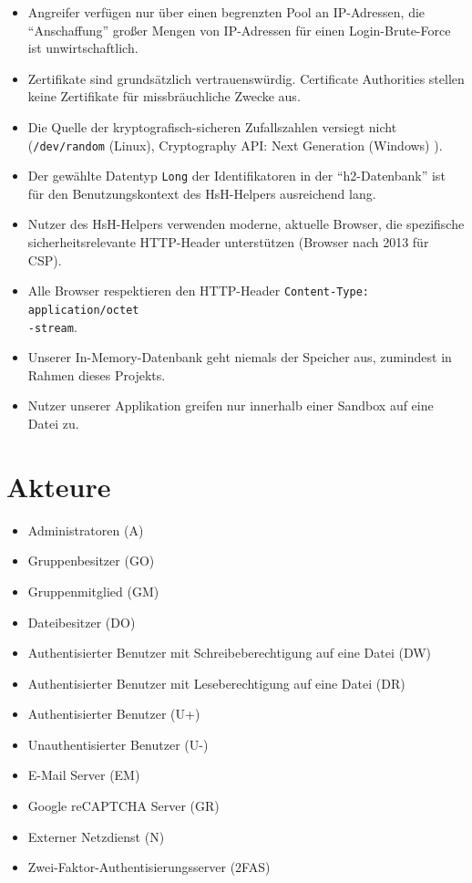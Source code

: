 \documentclass[fontsize=12pt,DIV=14,BCOR=10mm,a4paper,parskip=half-,headsepline,headinclude,english,ngerman,bibliography=totocnumbered]{scrreprt}
\begin{document}
\begin{itemize}
  \item Angreifer verfügen nur über einen begrenzten Pool an IP-Adressen, die \enquote{Anschaffung} großer Mengen von IP-Adressen für einen Login-Brute-Force ist unwirtschaftlich.
  \item Zertifikate sind grundsätzlich vertrauenswürdig. Certificate Authorities stellen keine Zertifikate für missbräuchliche Zwecke aus.
  \item Die Quelle der kryptografisch-sicheren Zufallszahlen versiegt nicht (\texttt{/dev/random} (Linux), Cryptography API: Next Generation (Windows) \autocite{Windows.SecureRandom}).
  \item Der gewählte Datentyp \texttt{Long} der Identifikatoren in der \enquote{h2-Datenbank} ist für den Benutzungskontext des HsH-Helpers ausreichend lang.
  \item Nutzer des HsH-Helpers verwenden moderne, aktuelle Browser, die spezifische sicherheitsrelevante HTTP-Header unterstützen (Browser nach 2013 für CSP).
  \item Alle Browser respektieren den HTTP-Header \texttt{Content-Type: application/octet\\-stream}.
  \item Unserer In-Memory-Datenbank geht niemals der Speicher aus, zumindest in Rahmen dieses Projekts.
  \item Nutzer unserer Applikation greifen nur innerhalb einer Sandbox auf eine Datei zu.
\end{itemize}

\renewcommand*{\chapterheadstartvskip}{\vspace*{\topskip}}

\chapter{Akteure}

\begin{itemize}
  \item Administratoren (A)
  \item Gruppenbesitzer (GO)
  \item Gruppenmitglied (GM)
  \item Dateibesitzer (DO)
  \item Authentisierter Benutzer mit Schreibeberechtigung auf eine Datei (DW)
  \item Authentisierter Benutzer mit Leseberechtigung auf eine Datei (DR)
  \item Authentisierter Benutzer (U+)
  \item Unauthentisierter Benutzer (U-)
  \item E-Mail Server (EM)
  \item Google reCAPTCHA Server (GR)
  \item Externer Netzdienst (N)
  \item Zwei-Faktor-Authentisierungsserver (2FAS)
\end{itemize}
\end{document}
